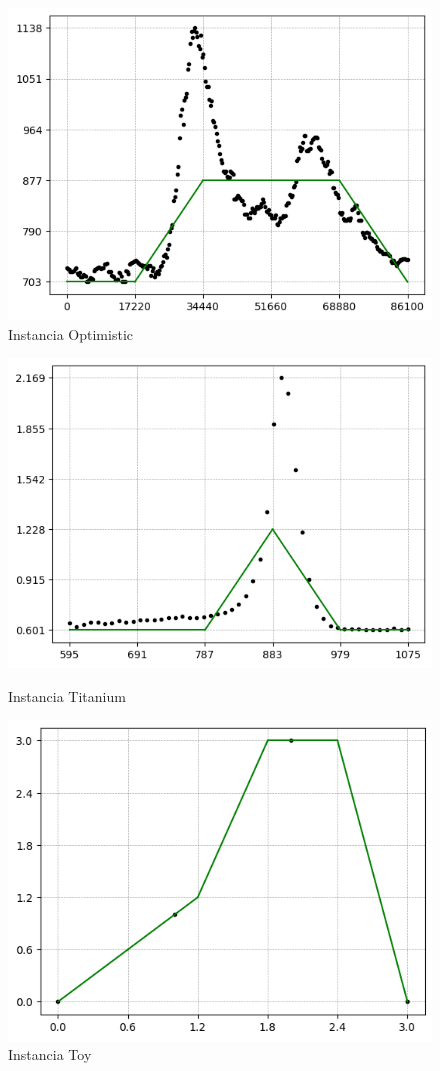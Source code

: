 \documentclass{article}
\begin{document}
\begin{figure}[h!]
\begin{minipage}{.3\textwidth}
            \includegraphics[width=.8\linewidth]{graficos/optimistic_6x6_4.png}
            \caption{Instancia Optimistic}
          \end{minipage}%
          
    \end{figure}
    
    \begin{figure}[h!]
          \centering
            \begin{minipage}{.3\textwidth}
            \centering
            \includegraphics[width=.8\linewidth]{graficos/titanium_6x6_4.png}
            \caption{Instancia Titanium}
          \end{minipage}%
          \begin{minipage}{.3\textwidth}
            \centering
            \includegraphics[width=.8\linewidth]{graficos/toy_6x6_4.png}
            \caption{Instancia Toy}
          \end{minipage}%
        \end{figure}
\end{document}
